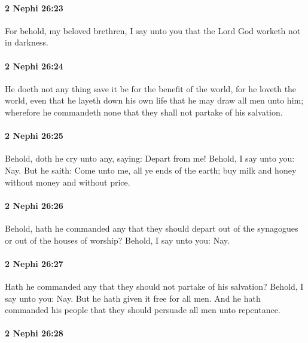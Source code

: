		\paragraph{2 Nephi 26:23} %
			\label{2NEPHI-26-23}

			For behold, my beloved brethren, I say unto you
			that the Lord God worketh not in darkness.

		\paragraph{2 Nephi 26:24} %
			\label{2NEPHI-26-24}

			He doeth not any thing save it be for the benefit of the world,
			for he loveth the world, even that he layeth down his own life
			that he may draw all men unto him;
			wherefore he commandeth none that they shall not partake of his salvation.

		\paragraph{2 Nephi 26:25} %
			\label{2NEPHI-26-25}

			Behold, doth he cry unto any, saying:
			Depart from me!
			Behold, I say unto you: Nay.
			But he saith:
			Come unto me, all ye ends of the earth;
			buy milk and honey without money and without price.

		\paragraph{2 Nephi 26:26} %
			\label{2NEPHI-26-26}

			Behold, hath he commanded any that they should depart
			out of the synagogues or out of the houses of worship?
			Behold, I say unto you: Nay.

		\paragraph{2 Nephi 26:27} %
			\label{2NEPHI-26-27}

			Hath he commanded any that they should not partake of his salvation?
			Behold, I say unto you: Nay.
			But he hath given it free for all men.
			And he hath commanded his people
			that they should persuade all men unto repentance.

		\paragraph{2 Nephi 26:28} %
			\label{2NEPHI-26-28}

